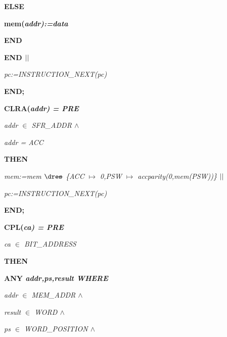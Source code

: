 \begin{sloppypar}
\hspace*{0.30in}\bf ELSE

\hspace*{0.40in}\bf mem\rm (\it addr\rm )\rm :=\it data

\hspace*{0.30in}\bf END

\hspace*{0.20in}\bf END  $\mbox{$\mid\mid$}$ 

\hspace*{0.20in}\it pc\rm :=\it INSTRUCTION\_NEXT\rm (\it pc\rm )

\hspace*{0.10in}\bf END\rm ;

\hspace*{0.10in}\bf CLRA\rm (\it addr\rm ) \rm = \bf PRE

\hspace*{0.20in}\it addr $\in$  \it SFR\_ADDR  $\land$ 

\hspace*{0.20in}\it addr \rm = \it ACC

\hspace*{0.10in}\bf THEN

\hspace*{0.20in}\it mem\rm :=\it mem $\lover$ \rm \{\it ACC $\mapsto$ \rm 0\rm ,\it PSW $\mapsto$ \it accparity\rm (\rm 0\rm ,\it mem\rm (\it PSW\rm )\rm )\rm \}  $\mbox{$\mid\mid$}$ 

\hspace*{0.20in}\it pc\rm :=\it INSTRUCTION\_NEXT\rm (\it pc\rm )

\hspace*{0.10in}\bf END\rm ;

\hspace*{0.10in}\bf CPL\rm (\it ca\rm ) \rm = \bf PRE

\hspace*{0.20in}\it ca $\in$  \it BIT\_ADDRESS

\hspace*{0.10in}\bf THEN

\hspace*{0.20in}\bf ANY \it addr\rm ,\it ps\rm ,\it result \bf WHERE

\hspace*{0.30in}\it addr $\in$  \it MEM\_ADDR  $\land$ 

\hspace*{0.30in}\it result $\in$  \it WORD  $\land$ 

\hspace*{0.30in}\it ps $\in$  \it WORD\_POSITION  $\land$ 


\end{sloppypar}

